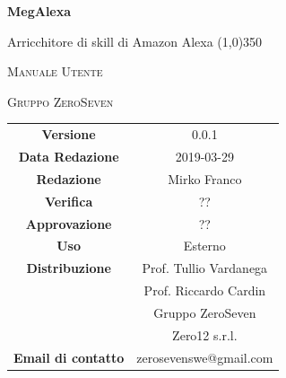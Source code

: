 \documentclass[a4paper,12pt,openany]{book}
\author{Ludovico Brocca}
\date{2018-12-19}
\begin{document}
\begin{titlepage}
	\centering
	{\huge\bfseries MegAlexa \par}
	Arricchitore di skill di Amazon Alexa
	\line(1,0){350} \\
	{\scshape\LARGE Manuale Utente \par}
	\vspace{1cm}
	{\scshape Gruppo ZeroSeven \par}
	\logo
	\begin{tabular}{c|c}
		{\hfill \textbf{Versione}} 			& 0.0.1		\\
		{\hfill\textbf{Data Redazione}} 	& 2019-03-29	\\ 
		{\hfill\textbf{Redazione}} 			&  		Mirko Franco \\
		{\hfill\textbf{Verifica}} 				&  	?? \\
		{\hfill\textbf{Approvazione}} 		&  	?? \\
		{\hfill\textbf{Uso}} 					& 		Esterno		\\ 
		{\hfill\textbf{Distribuzione}} 			& 			Prof. Tullio Vardanega \\ & Prof. Riccardo Cardin \\ & Gruppo ZeroSeven	\\ & Zero12 s.r.l. \\
		{\hfill\textbf{Email di contatto}} & zerosevenswe@gmail.com \\
	\end{tabular}
\end{titlepage}
	
	\label{LastFrontPage}
	\newpage	
	
	\pagestyle{mymain}
	\tableofcontents
	\listoffigures
	\listoftables
	
	\label{LastPage}
\end{document}
